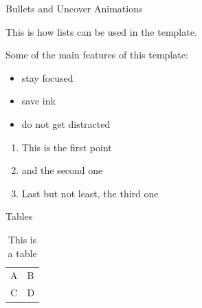 \documentclass[]{beamer}
\begin{document}
\begin{frame}{Bullets and Uncover Animations}

This is how lists can be used in the template. \\ \vspace{1em}

Some of the main features of this template:
	
	\begin{itemize}
		\item<1-> stay focused
		\item<2-> save ink
		\item<3-> do not get distracted
	\end{itemize}

	\vspace{1em}	

	\begin{enumerate}
		\item<5-> This is the first point
		\item<6-> and the second one
		\item<7-> Last but not least, the third one
	\end{enumerate}
	
\end{frame}

\begin{frame}{Tables}
	\begin{table}
		\begin{tabular}{ll}
			A & B\\
			C & D
		\end{tabular}
		\caption{This is a table}
		\label{tbl:simpletable}
	\end{table}
\end{frame}

\end{document}
